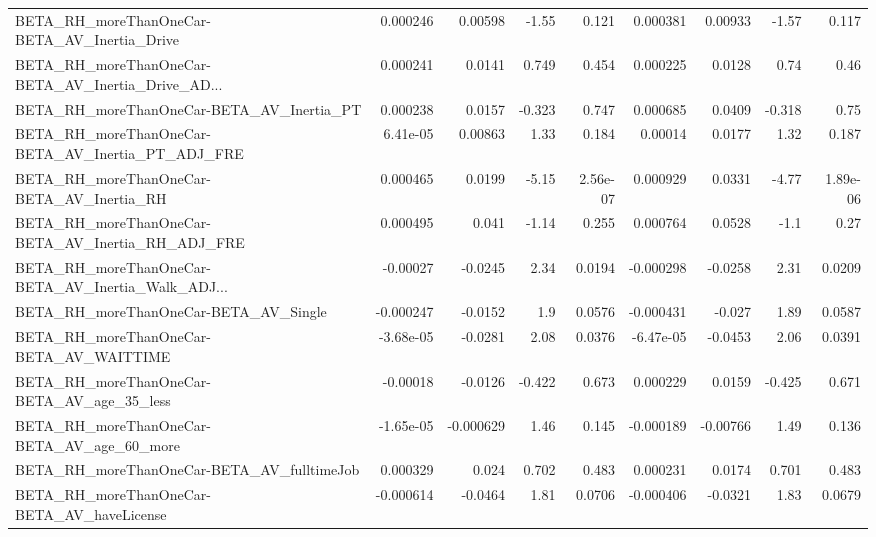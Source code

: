\begin{tabular}{lrrrrrrrr}
BETA\_RH\_moreThanOneCar-BETA\_AV\_Inertia\_Drive       &    0.000246 &      0.00598 &    -1.55 &    0.121 &   0.000381 &     0.00933 &        -1.57 &         0.117 \\
BETA\_RH\_moreThanOneCar-BETA\_AV\_Inertia\_Drive\_AD... &    0.000241 &       0.0141 &    0.749 &    0.454 &   0.000225 &      0.0128 &         0.74 &          0.46 \\
BETA\_RH\_moreThanOneCar-BETA\_AV\_Inertia\_PT          &    0.000238 &       0.0157 &   -0.323 &    0.747 &   0.000685 &      0.0409 &       -0.318 &          0.75 \\
BETA\_RH\_moreThanOneCar-BETA\_AV\_Inertia\_PT\_ADJ\_FRE  &    6.41e-05 &      0.00863 &     1.33 &    0.184 &    0.00014 &      0.0177 &         1.32 &         0.187 \\
BETA\_RH\_moreThanOneCar-BETA\_AV\_Inertia\_RH          &    0.000465 &       0.0199 &    -5.15 & 2.56e-07 &   0.000929 &      0.0331 &        -4.77 &      1.89e-06 \\
BETA\_RH\_moreThanOneCar-BETA\_AV\_Inertia\_RH\_ADJ\_FRE  &    0.000495 &        0.041 &    -1.14 &    0.255 &   0.000764 &      0.0528 &         -1.1 &          0.27 \\
BETA\_RH\_moreThanOneCar-BETA\_AV\_Inertia\_Walk\_ADJ... &    -0.00027 &      -0.0245 &     2.34 &   0.0194 &  -0.000298 &     -0.0258 &         2.31 &        0.0209 \\
BETA\_RH\_moreThanOneCar-BETA\_AV\_Single              &   -0.000247 &      -0.0152 &      1.9 &   0.0576 &  -0.000431 &      -0.027 &         1.89 &        0.0587 \\
BETA\_RH\_moreThanOneCar-BETA\_AV\_WAITTIME            &   -3.68e-05 &      -0.0281 &     2.08 &   0.0376 &  -6.47e-05 &     -0.0453 &         2.06 &        0.0391 \\
BETA\_RH\_moreThanOneCar-BETA\_AV\_age\_35\_less         &    -0.00018 &      -0.0126 &   -0.422 &    0.673 &   0.000229 &      0.0159 &       -0.425 &         0.671 \\
BETA\_RH\_moreThanOneCar-BETA\_AV\_age\_60\_more         &   -1.65e-05 &    -0.000629 &     1.46 &    0.145 &  -0.000189 &    -0.00766 &         1.49 &         0.136 \\
BETA\_RH\_moreThanOneCar-BETA\_AV\_fulltimeJob         &    0.000329 &        0.024 &    0.702 &    0.483 &   0.000231 &      0.0174 &        0.701 &         0.483 \\
BETA\_RH\_moreThanOneCar-BETA\_AV\_haveLicense         &   -0.000614 &      -0.0464 &     1.81 &   0.0706 &  -0.000406 &     -0.0321 &         1.83 &        0.0679 \\

\end{tabular}
